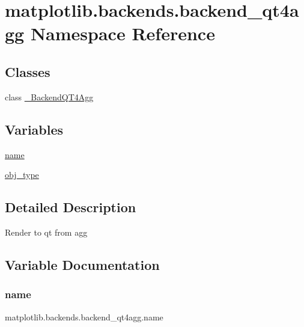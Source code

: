 \hypertarget{namespacematplotlib_1_1backends_1_1backend__qt4agg}{}\section{matplotlib.\+backends.\+backend\+\_\+qt4agg Namespace Reference}
\label{namespacematplotlib_1_1backends_1_1backend__qt4agg}
\subsection*{Classes}
\begin{DoxyCompactItemize}
\item 
class \hyperlink{classmatplotlib_1_1backends_1_1backend__qt4agg_1_1__BackendQT4Agg}{\+\_\+\+Backend\+Q\+T4\+Agg}
\end{DoxyCompactItemize}
\subsection*{Variables}
\begin{DoxyCompactItemize}
\item 
\hyperlink{namespacematplotlib_1_1backends_1_1backend__qt4agg_a76069d03991c68f34f93284db59d8542}{name}
\item 
\hyperlink{namespacematplotlib_1_1backends_1_1backend__qt4agg_af77d6fc45424bd3b2b85c7d7b480cece}{obj\+\_\+type}
\end{DoxyCompactItemize}


\subsection{Detailed Description}
\begin{DoxyVerb}Render to qt from agg
\end{DoxyVerb}
 

\subsection{Variable Documentation}
\mbox{\label{namespacematplotlib_1_1backends_1_1backend__qt4agg_a76069d03991c68f34f93284db59d8542}} 
\subsubsection{\texorpdfstring{name}{name}}
{\footnotesize\ttfamily matplotlib.\+backends.\+backend\+\_\+qt4agg.\+name}

